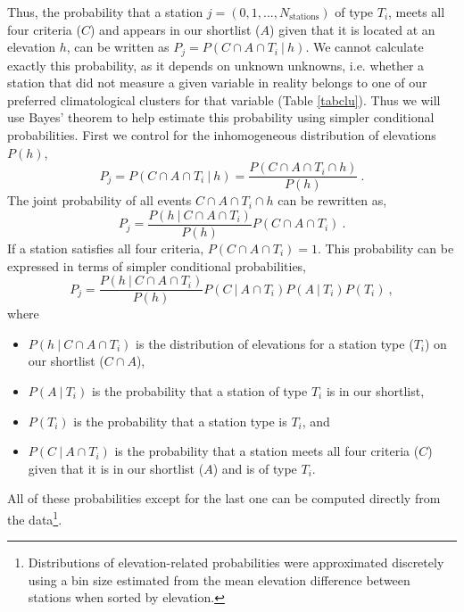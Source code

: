 \documentclass[12pt]{iopart}
\begin{document}
Thus, the probability that a station $j=(0,1,...,N_\mathrm{stations})$ of type $T_i$, meets all four criteria ($C$) and appears in our shortlist ($A$) given that it is located at an elevation $h$, can be written as $P_j=P(C\cap A\cap T_i\ |\ h)$. We cannot  calculate exactly this probability, as it depends on unknown unknowns, i.e. whether a station that did not measure a given variable in reality belongs to one of our preferred climatological clusters for that variable (Table \ref{tabclu}). Thus we will use Bayes' theorem to help estimate this probability using simpler conditional probabilities. First we control for the inhomogeneous distribution of elevations $P(h)$,
\begin{equation}
P_j=P(C\cap A\cap T_i\ |\ h)=\frac{P(C\cap A\cap T_i\cap h)}{P(h)}\ .
\end{equation}
The joint probability of all events $C\cap A\cap T_i\cap h$ can be rewritten as,
\begin{equation}
P_j=\frac{P(h\ |\ C\cap A\cap T_i)}{P(h)}P(C\cap A\cap T_i)\ .
\end{equation}
If a station satisfies all four criteria, $P(C\cap A\cap T_i)=1$. This probability can be expressed in terms of simpler conditional probabilities,
\begin{equation}\label{peejay}
P_j=\frac{P(h\ |\ C\cap A\cap T_i)}{P(h)}P(C\ |\ A\cap T_i)P(A\ |\ T_i)P(T_i)\ ,
\end{equation}
where 
\begin{itemize}
\item $P(h\ |\ C\cap A\cap T_i)$ is the distribution of elevations for a station type ($T_i$) on our shortlist ($C\cap A$), 
\item $P(A\ |\ T_i)$ is the probability that a station of type $T_i$ is in our shortlist, 
\item $P(T_i)$ is the probability that a station type is $T_i$, and 
\item $P(C\ |\ A\cap T_i)$ is the probability that a station meets all four criteria ($C$) given that it is in our shortlist ($A$) and is of type $T_i$. 
\end{itemize}
All of these probabilities except for the last one can be computed directly from the data\footnote{Distributions of elevation-related probabilities were approximated discretely using a bin size estimated from the mean elevation difference between stations when sorted by elevation. }.\\
\end{document}
